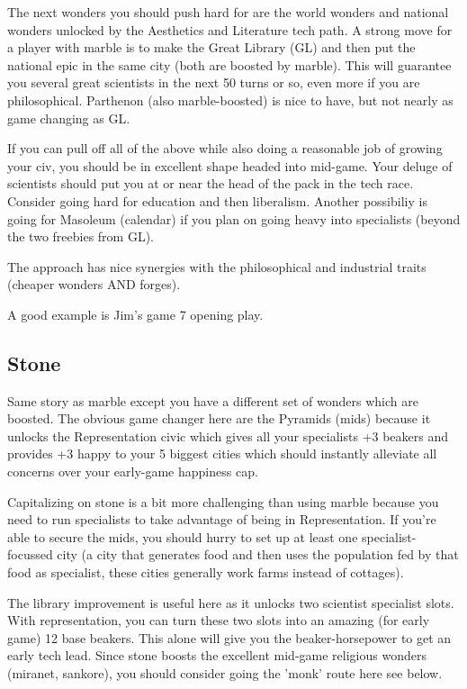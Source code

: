 \documentclass[10pt]{article}
\begin{document}
The next wonders you should push hard for are the world wonders and
national wonders unlocked by the Aesthetics and Literature tech
path. A strong move for a player with marble is to make the Great
Library (GL) and then put the national epic in the same city (both are
boosted by marble). This will guarantee you several great scientists
in the next 50 turns or so, even more if you are
philosophical. Parthenon (also marble-boosted) is nice to have, but
not nearly as game changing as GL.

If you can pull off all of the above while also doing a reasonable job
of growing your civ, you should be in excellent shape headed into
mid-game. Your deluge of scientists should put you at or near the head
of the pack in the tech race. Consider going hard for education and
then liberalism. Another possibiliy is going for Masoleum (calendar)
if you plan on going heavy into specialists (beyond the two freebies
from GL).

The approach has nice synergies with the philosophical and industrial traits (cheaper wonders AND forges).

A good example is Jim's game 7 opening play.

\subsection*{Stone}

Same story as marble except you have a different set of wonders which are boosted. The obvious game changer
here are the Pyramids (mids) because it unlocks the Representation civic which gives all your specialists +3
beakers and provides +3 happy to your 5 biggest cities which should instantly alleviate all concerns over
your early-game happiness cap.

Capitalizing on stone is a bit more challenging than using marble because you need to run specialists to
take advantage of being in Representation. If you're able to secure the mids, you should hurry to set up
at least one specialist-focussed city (a city that generates food and then uses the population fed by that
food as specialist, these cities generally work farms instead of cottages).

The library improvement is useful here as it unlocks two scientist specialist slots. With representation,
you can turn these two slots into an amazing (for early game) 12 base beakers. This alone will give you
the beaker-horsepower to get an early tech lead. Since stone boosts the excellent mid-game religious wonders
(miranet, sankore), you should consider going the 'monk' route here see below.
\end{document}
